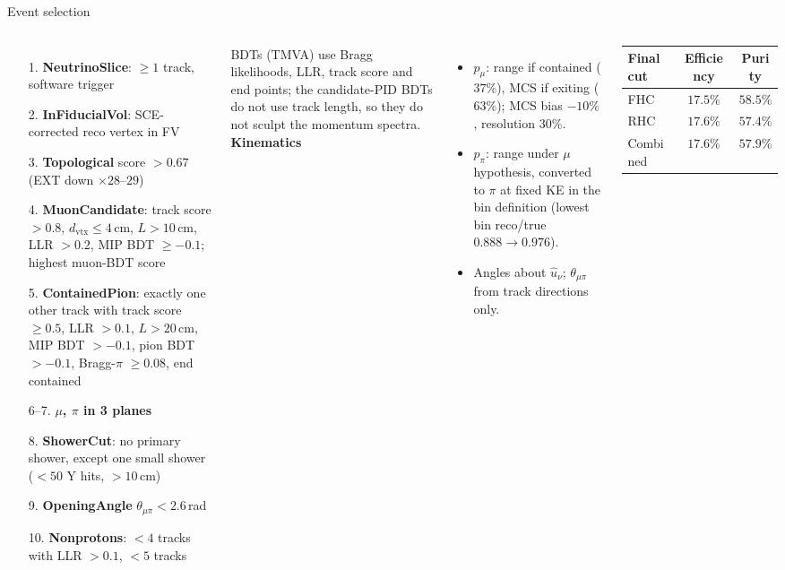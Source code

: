 \documentclass[aspectratio=169,10pt]{beamer}
\begin{document}
\begin{frame}{Event selection}
  \begin{columns}[T]
  \scriptsize
  \begin{enumerate}\setlength\itemsep{0pt}
    \item[1.] \textbf{NeutrinoSlice}: $\ge1$ track, software trigger
    \item[2.] \textbf{InFiducialVol}: SCE-corrected reco vertex in FV
    \item[3.] \textbf{Topological} score $>0.67$ (EXT down $\times28$--$29$)
    \item[4.] \textbf{MuonCandidate}: track score $>0.8$, $d_\mathrm{vtx}\le4$\,cm, $L>10$\,cm, LLR $>0.2$, MIP BDT $\ge-0.1$; highest muon-BDT score
    \item[5.] \textbf{ContainedPion}: exactly one other track with track score $\ge0.5$, LLR $>0.1$, $L>20$\,cm, MIP BDT $>-0.1$, pion BDT $>-0.1$, Bragg-$\pi$ $\ge0.08$, end contained
    \item[6--7.] \textbf{$\mu$, $\pi$ in 3 planes}
    \item[8.] \textbf{ShowerCut}: no primary shower, except one small shower ($<50$ Y hits, $>10$\,cm)
    \item[9.] \textbf{OpeningAngle} $\theta_{\mu\pi}<2.6$\,rad
    \item[10.] \textbf{Nonprotons}: $<4$ tracks with LLR $>0.1$, $<5$ tracks
  \end{enumerate}
  BDTs (TMVA) use Bragg likelihoods, LLR, track score and end points; the candidate-PID BDTs do not use
  track length, so they do not sculpt the momentum spectra.
  \scriptsize\centering
  \textbf{Kinematics}
  \begin{itemize}\raggedright\setlength\itemsep{2pt}
    \item $p_\mu$: range if contained ($37\%$), MCS if exiting ($63\%$); MCS bias $-10\%$, resolution $30\%$.
    \item $p_\pi$: range under $\mu$ hypothesis, converted to $\pi$ at fixed KE in the bin definition
      (lowest bin reco/true $0.888\to0.976$).
    \item Angles about $\hat u_\nu$; $\theta_{\mu\pi}$ from track directions only.
  \end{itemize}
  \vspace{2mm}
  \setlength{\tabcolsep}{3pt}
  \begin{tabular}{lcc}
    \toprule
    Final cut & Efficiency & Purity \\\midrule
    FHC & $17.5\%$ & $58.5\%$ \\
    RHC & $17.6\%$ & $57.4\%$ \\
    Combined & $17.6\%$ & $57.9\%$ \\
    \bottomrule
  \end{tabular}
  \end{columns}
\end{frame}
\end{document}
